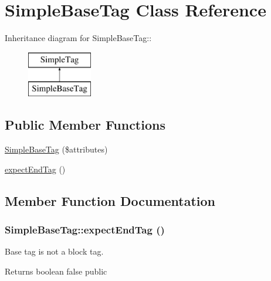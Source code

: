 \hypertarget{class_simple_base_tag}{
\section{SimpleBaseTag Class Reference}
\label{class_simple_base_tag}
}
Inheritance diagram for SimpleBaseTag::\begin{figure}[H]
\begin{center}
\leavevmode
\includegraphics[height=2cm]{class_simple_base_tag}
\end{center}
\end{figure}
\subsection*{Public Member Functions}
\begin{DoxyCompactItemize}
\item 
\hyperlink{class_simple_base_tag_ac4f8adc4312874c21281e59ed7465354}{SimpleBaseTag} (\$attributes)
\item 
\hyperlink{class_simple_base_tag_aa3d88230adaca8282352b98bb5fbd03b}{expectEndTag} ()
\end{DoxyCompactItemize}


\subsection{Member Function Documentation}
\hypertarget{class_simple_base_tag_aa3d88230adaca8282352b98bb5fbd03b}{
\subsubsection[{expectEndTag}]{\setlength{\rightskip}{0pt plus 5cm}SimpleBaseTag::expectEndTag ()}}
\label{class_simple_base_tag_aa3d88230adaca8282352b98bb5fbd03b}
Base tag is not a block tag. \begin{DoxyReturn}{Returns}
boolean false  public 
\end{DoxyReturn}


